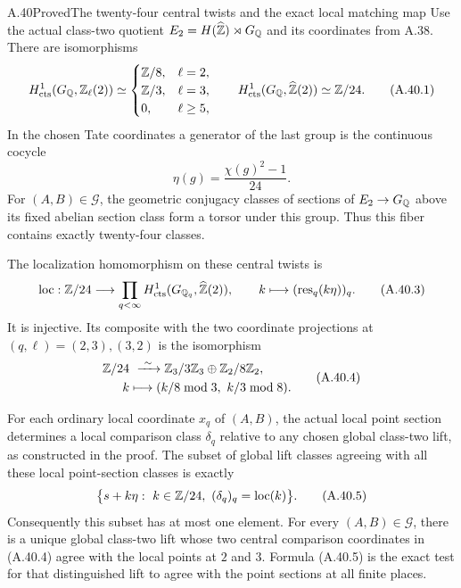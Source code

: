 \begin{statement}{A.40}{Proved}{The twenty-four central twists and the exact local matching map}
Use the actual class-two quotient $E_2=H(\widehat{\mathbb Z})\rtimes G_\mathbb Q$
and its coordinates from A.38.  There are isomorphisms
\[
 H^1_{\rm cts}(G_\mathbb Q,\mathbb Z_\ell(2))\simeq
 \begin{cases}
  \mathbb Z/8,&\ell=2,\\
  \mathbb Z/3,&\ell=3,\\
  0,&\ell\ge5,
 \end{cases}
 \qquad
 H^1_{\rm cts}(G_\mathbb Q,\widehat{\mathbb Z}(2))\simeq\mathbb Z/24.
 \tag{A.40.1}
\]
In the chosen Tate coordinates a generator of the last group is
the continuous cocycle
\[
                \eta(g)=\frac{\chi(g)^2-1}{24}.
 \tag{A.40.2}
\]
For $(A,B)\in\mathcal G$, the geometric conjugacy classes of
sections of $E_2\to G_\mathbb Q$ above its fixed abelian section class
form a torsor under this group.  Thus this fiber contains exactly
twenty-four classes.

The localization homomorphism on these central twists is
\[
 \operatorname{loc}:\mathbb Z/24\longrightarrow
       \prod_{q<\infty}H^1_{\rm cts}(G_{\mathbb Q_q},\widehat{\mathbb Z}(2)),
 \qquad k\longmapsto(\operatorname{res}_q(k\eta))_q.
 \tag{A.40.3}
\]
It is injective.  Its composite with the two coordinate projections
at $(q,\ell)=(2,3),(3,2)$ is the isomorphism
\[
 \begin{split}
 \mathbb Z/24&\ \xrightarrow{\ \sim\ }
       \mathbb Z_3/3\mathbb Z_3\oplus\mathbb Z_2/8\mathbb Z_2,\\
 k&\longmapsto(k/8\bmod3,\ k/3\bmod8).
 \end{split}
 \tag{A.40.4}
\]

For each ordinary local coordinate $x_q$ of $(A,B)$, the actual
local point section determines a local comparison class
$\delta_q$ relative to any chosen global class-two lift, as
constructed in the proof.  The subset of global lift classes
agreeing with all these local point-section classes is exactly
\[
 \bigl\{s+k\eta:\ k\in\mathbb Z/24,
              \ (\delta_q)_q=\operatorname{loc}(k)\bigr\}.
 \tag{A.40.5}
\]
Consequently this subset has at most one element.  For every
$(A,B)\in\mathcal G$, there is a unique global class-two lift
whose two central comparison coordinates in (A.40.4) agree with
the local points at $2$ and $3$.  Formula (A.40.5) is the exact
test for that distinguished lift to agree with the point sections
at all finite places.
\end{statement}
